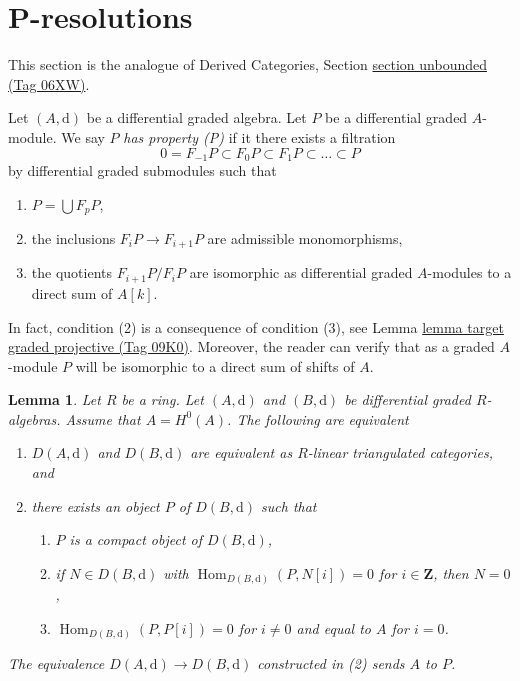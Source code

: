 \documentclass{amsart}
\theoremstyle{plain}
\newtheorem{lemma}[subsection]{Lemma}
\theoremstyle{definition}
\theoremstyle{remark}
\numberwithin{equation}{subsection}
\def\Hom{\mathop{\mathrm{Hom}}\nolimits}
\begin{document}
\section{P-resolutions}
\label{section-P-resolutions}

\noindent
This section is the analogue of
Derived Categories, Section \href{https://stacks.math.columbia.edu/tag/06XW}{section unbounded (Tag 06XW)}.

\medskip\noindent
Let $(A, \text{d})$ be a differential graded algebra.
Let $P$ be a differential graded $A$-module. We say $P$
{\it has property (P)} if it there exists a filtration
$$
0 = F_{-1}P \subset F_0P \subset F_1P \subset \ldots \subset P
$$
by differential graded submodules such that
\begin{enumerate}
\item $P = \bigcup F_pP$,
\item the inclusions $F_iP \to F_{i + 1}P$ are admissible
monomorphisms,
\item the quotients $F_{i + 1}P/F_iP$ are isomorphic as differential
graded $A$-modules to a direct sum of $A[k]$.
\end{enumerate}
In fact, condition (2) is a consequence of condition (3), see
Lemma \href{https://stacks.math.columbia.edu/tag/09K0}{lemma target graded projective (Tag 09K0)}. Moreover, the reader
can verify that as a graded $A$-module $P$ will be isomorphic to a
direct sum of shifts of $A$.


\begin{lemma}
\label{lemma-rickard}
Let $R$ be a ring. Let $(A, \text{d})$ and $(B, \text{d})$ be
differential graded $R$-algebras. Assume that $A = H^0(A)$.
The following are equivalent
\begin{enumerate}
\item $D(A, \text{d})$ and $D(B, \text{d})$ are equivalent as $R$-linear
triangulated categories, and
\item there exists an object $P$ of $D(B, \text{d})$ such that
\begin{enumerate}
\item $P$ is a compact object of $D(B, \text{d})$,
\item if $N \in D(B, \text{d})$ with $\Hom_{D(B, \text{d})}(P, N[i]) = 0$
for $i \in \mathbf{Z}$, then $N = 0$,
\item $\Hom_{D(B, \text{d})}(P, P[i]) = 0$ for $i \not = 0$ and
equal to $A$ for $i = 0$.
\end{enumerate}
\end{enumerate}
The equivalence $D(A, \text{d}) \to D(B, \text{d})$
constructed in (2) sends $A$ to $P$.
\end{lemma}
\end{document}
